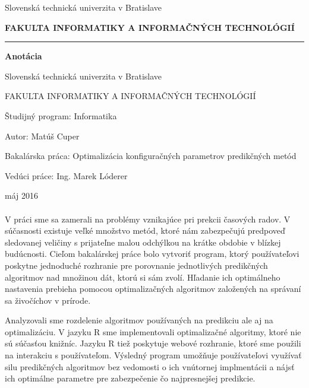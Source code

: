 \documentclass[a4paper,slovak,12pt,appendix]{article}
\begin{document}

\newpage
\thispagestyle{plain}
\begin{center}
  {\small Slovenská technická univerzita v Bratislave \par}
  {\small \textbf{FAKULTA INFORMATIKY A INFORMAČNÝCH TECHNOLÓGIÍ}}
  \rule{\textwidth}{1pt}

  \vspace*{1.5cm}
  \begin{Large}
    \textbf{Anotácia} \par
  \end{Large}
\end{center}
{Slovenská technická univerzita v Bratislave \par}
{FAKULTA INFORMATIKY A INFORMAČNÝCH TECHNOLÓGIÍ \par}
{Študijný program: Informatika \par}
{Autor: Matúš Cuper \par}
{Bakalárska práca: Optimalizácia konfiguračných parametrov predikčných metód \par}
{Vedúci práce: Ing. Marek Lóderer \par}
{máj 2016 \\} \\
V práci sme sa zamerali na problémy vznikajúce pri prekcii časových radov.
V súčasnosti existuje veľké množstvo metód, ktoré nám zabezpečujú predpoveď
sledovanej veličiny s prijateľne malou odchýlkou na krátke obdobie v blízkej
budúcnosti. Cieľom bakalárskej práce bolo vytvoriť program, ktorý používateľovi
poskytne jednoduché rozhranie pre porovnanie jednotlivých predikčných
algoritmov nad množinou dát, ktorú si sám zvolí. Hľadanie ich optimálneho
nastavenia prebieha pomocou optimalizačných algoritmov založených na správaní
sa živočíchov v prírode.

Analyzovali sme rozdelenie algoritmov používaných na predikciu ale aj na
optimalizáciu. V jazyku R sme implementovali optimalizačné algoritmy, ktoré nie
sú súčasťou knižníc. Jazyku R tiež poskytuje webové rozhranie, ktoré sme
použili na interakciu s používateľom. Výsledný program umožňuje používateľovi
využívať silu predikčných algoritmov bez vedomosti o ich vnútornej
implmentácii a nájsť ich optimálne parametre pre zabezpečenie čo
najpresnejšej predikcie.
\end{document}
